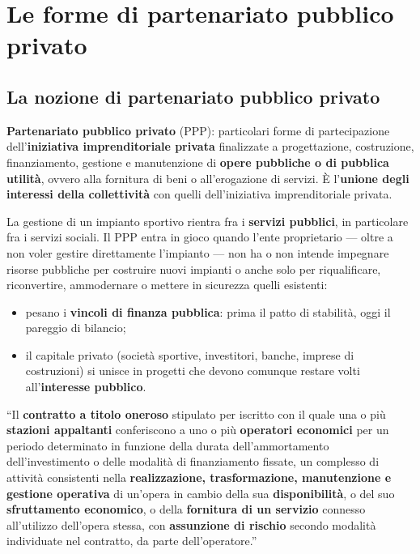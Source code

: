 \chapter{Le forme di partenariato pubblico privato}

\section{La nozione di partenariato pubblico privato}

\textbf{Partenariato pubblico privato} (PPP): particolari forme di partecipazione
dell'\textbf{iniziativa imprenditoriale privata} finalizzate a progettazione, costruzione,
finanziamento, gestione e manutenzione di \textbf{opere pubbliche o di pubblica utilità}, ovvero
alla fornitura di beni o all'erogazione di servizi. È l'\textbf{unione degli interessi della
collettività} con quelli dell'iniziativa imprenditoriale privata.


La gestione di un impianto sportivo rientra fra i \textbf{servizi pubblici}, in particolare fra i
servizi sociali. Il PPP entra in gioco quando l'ente proprietario --- oltre a non voler gestire
direttamente l'impianto --- non ha o non intende impegnare risorse pubbliche per costruire nuovi
impianti o anche solo per riqualificare, riconvertire, ammodernare o mettere in sicurezza quelli
esistenti:

\begin{itemize}
  \item pesano i \textbf{vincoli di finanza pubblica}: prima il patto di stabilità, oggi il
    pareggio di bilancio;
  \item il capitale privato (società sportive, investitori, banche, imprese di costruzioni) si
    unisce in progetti che devono comunque restare volti all'\textbf{interesse pubblico}.
\end{itemize}


``Il \textbf{contratto a titolo oneroso} stipulato per iscritto con il quale una o più
\textbf{stazioni appaltanti} conferiscono a uno o più \textbf{operatori economici} per un periodo
determinato in funzione della durata dell'ammortamento dell'investimento o delle modalità di
finanziamento fissate, un complesso di attività consistenti nella \textbf{realizzazione,
trasformazione, manutenzione e gestione operativa} di un'opera in cambio della sua
\textbf{disponibilità}, o del suo \textbf{sfruttamento economico}, o della \textbf{fornitura di un
servizio} connesso all'utilizzo dell'opera stessa, con \textbf{assunzione di rischio} secondo
modalità individuate nel contratto, da parte dell'operatore.''

